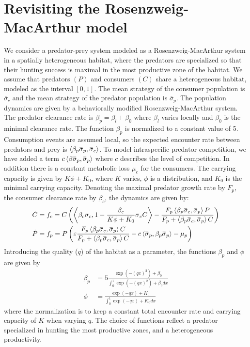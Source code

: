 \section{Revisiting the Rosenzweig-MacArthur model}
\label{sec:model_rm}
We consider a predator-prey system modeled as a Rosenzweig-MacArthur system in a spatially heterogeneous habitat, where the predators are specialized so that their hunting success is maximal in the most productive zone of the habitat.
We assume that predators $(P)$ and consumers $(C)$ share a heterogeneous habitat, modeled as the interval $[0,1]$. The mean strategy of the consumer population is $\overbar{\sigma}_c$ and the mean strategy of the predator population is $\overbar{\sigma}_p$.
The population dynamics are given by a behaviorally modified Rosenzweig-MacArthur system. The predator clearance rate is $\beta_p = \beta_{l} + \beta_0$ where $\beta_l$ varies locally and $\beta_0$ is the minimal clearance rate. The function $\beta_p$ is normalized to a constant value of 5.
Consumption events are assumed local, so the expected encounter rate between predators and prey is $\ip{\beta_p \overbar{\sigma}_p}{\overbar{\sigma}_c}$. To model intraspecific predator competition, we have added a term $c\ip{\beta \overbar{\sigma}_p}{\overbar{\sigma}_p}$ where $c$ describes the level of competition. In addition there is a constant metabolic loss $\mu_c$ for the consumers. The carrying capacity is given by $K\phi + K_0$,
 where $K$ varies, $\phi$ is a distribution, and $K_0$ is the minimal carrying capacity. Denoting the maximal predator growth rate by $F_p$, the consumer clearance rate by $\beta_c$, the dynamics are given by:
\begin{align}
  \dot{C} &= f_c = C \pa{\ip{\beta_c \overbar{\sigma}_c}{1-\frac{\beta_c}{K\phi + K_0}\overbar{\sigma}_c C} - \frac{F_p \ip{\beta_p \overbar{\sigma}_c}{\overbar{\sigma}_p} P}{F_p + \ip{\beta_p \overbar{\sigma}_c}{\overbar{\sigma}_p} C} } \\
  \dot{P} &= f_p = P \pa{\epsilon \frac{F_p \ip{\beta_p \overbar{\sigma}_c}{\overbar{\sigma}_p} C}{F_p + \ip{\beta_p \overbar{\sigma}_c}{\overbar{\sigma}_p} C} - c \ip{\overbar{\sigma}_p}{\beta_p \overbar{\sigma}_p}  - \mu_p}
  \label{eq:dynamics}
\end{align}
Introducing the quality ($q$) of the habitat as a parameter, the functions $\beta_p$ and $\phi$ are given by
\begin{align}
  \beta_p &= 5 \frac{\exp(-(q x)^2) + \beta_0}{\int_0^1 \exp(-(q x)^2) + \beta_0 dx} \\
  \phi &= \frac{\exp(-q x) + K_0}{\int_0^1 \exp(-q x) + K_0 dx}
\end{align}
where the normalization is to keep a constant total encounter rate and carrying capacity of $K$ when varying $q$. The choice of functions reflect a predator specialized in hunting the most productive zones, and a heterogeneous productivity.

